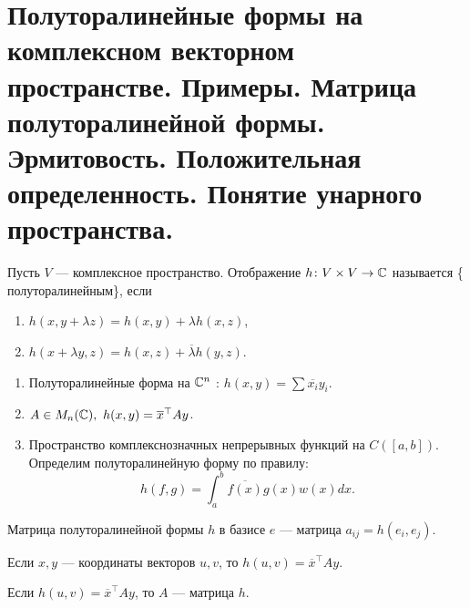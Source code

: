 \section{Полуторалинейные формы на комплексном векторном пространстве. Примеры. Матрица полуторалинейной формы. Эрмитовость. Положительная определенность. Понятие унарного пространства.}
\begin{defn}
    Пусть $ V$ --- комплексное пространство. Отображение $ h\colon V \times  V \to \mathbb{C}$ называется \{ \sf полуторалинейным\}, если 
    \begin{enumerate}[noitemsep]
	\item $ h(x,y + \lambda z) = h(x, y ) + \lambda h(x, z)$,
	\item $ h(x + \lambda y, z) = h(x, z) + \overline{\lambda} h(y, z)$.
    \end{enumerate} 
\end{defn}

\begin{ex}
    \begin{enumerate}[noitemsep]
	\item Полуторалинейные форма на  $ \mathbb{C} ^{n}$ : $ h(x, y) = \sum \overline{x_i}y_i$.
	\item $ A \in M_n(\mathbb{C}), ~ h(x, y) = \overline{x}^{\top} A y$.
	\item Пространство комплекснозначных непрерывных функций на $ C([a, b])$. Определим полуторалинейную форму по правилу:
	     \[
		 h(f, g) = \int_{a}^{b} \overline{f(x)} g(x) w(x) dx 
	    .\]
    \end{enumerate} 
\end{ex}
\begin{defn}
    {\sf Матрица полуторалинейной формы } $ h$ в базисе $ e$ --- матрица  $ a_{ij} = h(e_i, e_j)$.  
\end{defn}
\begin{lm}
    Если $ x, y$ --- координаты векторов  $ u, v$, то  $ h(u, v) = \overline{x}^{\top}A y$. 

    Если $ h(u, v) = \overline{x}^{\top}A y$, то $ A$ --- матрица  $ h$. 
\end{lm}

